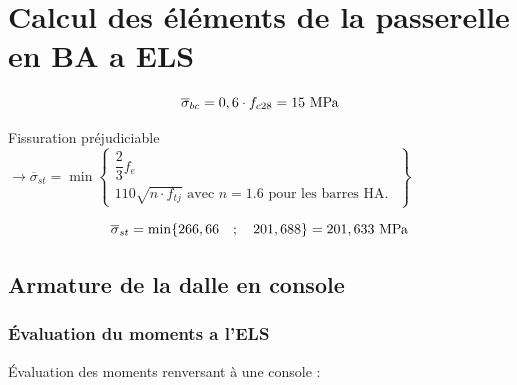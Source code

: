 \documentclass[12pt,a4paper]{article}
\begin{document}
	
	
	
	
	
	
	
	
	\section{Calcul des éléments de la passerelle en BA a \textbf{ELS}}
	
	
	\[ \overline{\sigma}_{bc} = 0,6 \cdot f_{c28} = 15\mpa \]
	
	
	Fissuration préjudiciable $\rightarrow \overline{\sigma}_{st} = \min \left. \begin{cases}
	\dfrac{2}{3}f_{e} \\
	110\sqrt{n \cdot f_{tj}} \text{ avec $n = 1.6$ pour les barres HA. }
	\end{cases}\right\}$ 
	
	\[ \overline{\sigma}_{st} = \min \{ 266,66 \quad;\quad 201,688  \} = 201,633\mpa \]
	
	
	
	
	
	
	
	
	
	
	
	
	
	
	
	\subsection{Armature de la dalle en console}
	
	\subsubsection{Évaluation du moments a l'ELS}
	
	Évaluation des moments renversant à une console : 
	
	
	
\end{document}
